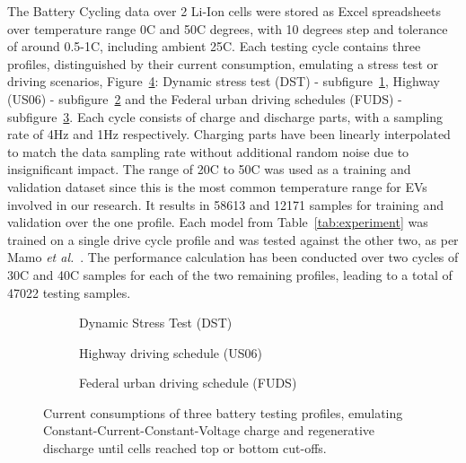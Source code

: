 %
The Battery Cycling data over 2 Li-Ion cells were stored as Excel spreadsheets over temperature range 0\textdegree{}C and 50\textdegree{}C degrees, with 10 degrees step and tolerance of around 0.5-1\textdegree{}C, including ambient 25\textdegree{}C.
Each testing cycle contains three profiles, distinguished by their current consumption, emulating a stress test or driving scenarios, Figure~\ref{fig:current-profs}: Dynamic stress test (DST) - subfigure~\ref{subfig:profs-DST}, Highway (US06) - subfigure~\ref{subfig:profs-US} and the Federal urban driving schedules (FUDS) - subfigure~\ref{subfig:profs-FUDS}.
Each cycle consists of charge and discharge parts, with a sampling rate of 4Hz and 1Hz respectively.
Charging parts have been linearly interpolated to match the data sampling rate without additional random noise due to insignificant impact.
The range of 20\textdegree{}C to 50\textdegree{}C was used as a training and validation dataset since this is the most common temperature range for EVs involved in our research.
It results in 58613 and 12171 samples for training and validation over the one profile.
Each model from \mbox{Table~\ref{tab:experiment}} was trained on a single drive cycle profile and was tested against the other two, as per Mamo \textit{et al.}~\cite{mamo_long_2020}.
The performance calculation has been conducted over two cycles of 30\textdegree{}C and 40\textdegree{}C samples for each of the two remaining profiles, leading to a total of 47022 testing samples.
\begin{figure}[htbp]
    \centering
    \begin{subfigure}[b]{\columnwidth}
        \centering
        
        \caption{Dynamic Stress Test (DST)}
        \label{subfig:profs-DST}
    \end{subfigure}
    \hfill
    \begin{subfigure}[b]{\columnwidth}
        \centering
        
        \caption{Highway driving schedule (US06)}
        \label{subfig:profs-US}
    \end{subfigure}
    \hfill
    \begin{subfigure}[b]{\columnwidth}
        \centering
        
        \caption{Federal urban driving schedule (FUDS)}
        \label{subfig:profs-FUDS}
    \end{subfigure}
    \caption{Current consumptions of three battery testing profiles, emulating Constant-Current-Constant-Voltage charge and regenerative discharge until cells reached top or bottom cut-offs.}
    \label{fig:current-profs}
\end{figure}

